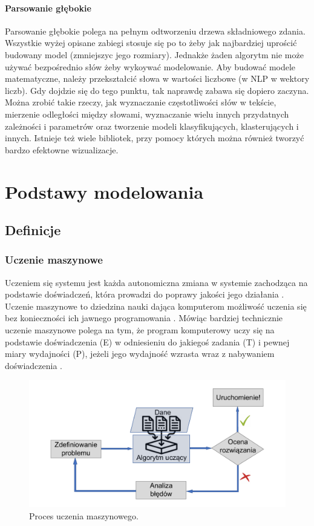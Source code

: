 \paragraph{Parsowanie głębokie}
Parsowanie głębokie polega na pełnym odtworzeniu drzewa składniowego zdania. 
\\

\noindent Wszystkie wyżej opisane zabiegi stosuje się po to żeby jak najbardziej uprościć budowany model (zmniejszyc jego rozmiary). Jednakże żaden algorytm nie może używać bezpośrednio słów żeby wykoywać modelowanie. Aby budować modele matematyczne, należy przekształcić  słowa w wartości liczbowe (w NLP  w wektory liczb). Gdy dojdzie się do tego punktu, tak naprawdę zabawa się dopiero zaczyna. Można zrobić takie rzeczy, jak wyznaczanie częstotliwości słów w tekście, mierzenie odległości między słowami, wyznaczanie wielu innych przydatnych zależności i parametrów oraz tworzenie modeli klasyfikujących, klasterujących i innych. Istnieje też wiele bibliotek, przy pomocy których można również tworzyć bardzo efektowne wizualizacje.

\section{Podstawy modelowania}
\subsection{Definicje}
\subsubsection{Uczenie maszynowe}
Uczeniem się systemu jest każda autonomiczna zmiana w systemie zachodząca na podstawie doświadczeń, która prowadzi do poprawy jakości jego działania \cite{cichosz2000}.\\
Uczenie maszynowe to dziedzina nauki dająca komputerom możliwość uczenia się bez konieczności ich jawnego programowania \cite{samuel1959}.  Mówiąc bardziej technicznie uczenie maszynowe polega na tym, że program komputerowy uczy się na podstawie doświadczenia (E) w odniesieniu do jakiegoś zadania (T) i pewnej miary wydajności (P), jeżeli jego wydajność wzrasta wraz z nabywaniem doświadczenia \cite{mitchell}.

\begin{figure}[H]
	\centering
	\includegraphics[width=0.75\linewidth]{images/chapter1/machineLearning.pdf }
	\caption{Proces uczenia maszynowego.}
	\label{fig:machine_learning}
\end{figure}


